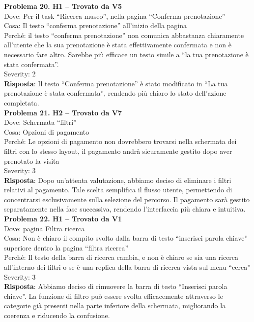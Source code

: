 \documentclass{article}
\begin{document}
\noindent \textbf{Problema 20. H1 – Trovato da V5} \\
Dove: Per il task “Ricerca museo”, nella pagina “Conferma prenotazione” \\
Cosa: Il testo “conferma prenotazione” all’inizio della pagina \\
Perché: il testo “conferma prenotazione” non comunica abbastanza chiaramente all’utente che la sua prenotazione è stata effettivamente confermata e non è necessario fare altro. Sarebbe più efficace un testo simile a “la tua prenotazione è stata confermata”. \\
Severity: 2 \\
\textbf{Risposta}: Il testo “Conferma prenotazione” è stato modificato in “La tua prenotazione è stata confermata”, rendendo più chiaro lo stato dell’azione completata.\\

\noindent \textbf{Problema 21. H2 – Trovato da V7} \\
Dove: Schermata “filtri” \\
Cosa: Opzioni di pagamento \\
Perché: Le opzioni di pagamento non dovrebbero trovarsi nella schermata dei filtri con lo stesso layout, il pagamento andrà sicuramente gestito dopo aver prenotato la visita \\
Severity: 3 \\
\textbf{Risposta}: Dopo un'attenta valutazione, abbiamo deciso di eliminare i filtri relativi al pagamento. Tale scelta semplifica il flusso utente, permettendo di concentrarsi esclusivamente sulla selezione del percorso. Il pagamento sarà gestito separatamente nella fase successiva, rendendo l’interfaccia più chiara e intuitiva.\\

\noindent \textbf{Problema 22. H1 – Trovato da V1} \\
Dove: pagina Filtra ricerca \\
Cosa: Non è chiaro il compito svolto dalla barra di testo “inserisci parola chiave” superiore dentro la pagina “filtra ricerca” \\
Perché: Il testo della barra di ricerca cambia, e non è chiaro se sia una ricerca all’interno dei filtri o se è una replica della barra di ricerca vista sul menu “cerca” \\
Severity: 3 \\
\textbf{Risposta}: Abbiamo deciso di rimuovere la barra di testo “Inserisci parola chiave”. La funzione di filtro può essere svolta efficacemente attraverso le categorie già presenti nella parte inferiore della schermata, migliorando la coerenza e riducendo la confusione.\\
\end{document}
